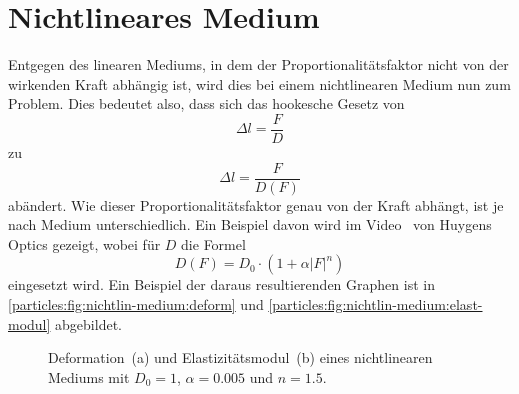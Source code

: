 %
%
%
%
\section{Nichtlineares Medium
\label{particles:section:nichtlinear}}
Entgegen des linearen Mediums, in dem der Proportionalitätsfaktor nicht von der wirkenden Kraft abhängig ist, 
wird dies bei einem nichtlinearen Medium nun zum Problem.
Dies bedeutet also, dass sich das hookesche Gesetz von 
\[
    \Delta l
    = 
    \frac{F}{D}
\]
zu
\[
    \Delta l
    = 
    \frac{F}{D(F)}
\]
abändert. 
Wie dieser Proportionalitätsfaktor genau von der Kraft abhängt, ist je nach Medium unterschiedlich.
Ein Beispiel davon wird im Video~\cite{particles:huygens-optics} von Huygens Optics gezeigt, wobei für $D$ die Formel 
\[
    D(F)
    =
    D_0
    \cdot
    (1 + \alpha |F|^n)
\]
eingesetzt wird. Ein Beispiel der daraus resultierenden Graphen ist in \autoref{particles:fig:nichtlin-medium:deform} und \autoref{particles:fig:nichtlin-medium:elast-modul} abgebildet.
\begin{figure}
    \centering
    \hfill
    \caption{Deformation~(a) und Elastizitätsmodul~(b) eines nichtlinearen Mediums mit $D_0 = 1$, $\alpha = 0.005$ und $n = 1.5$.}
\end{figure}

